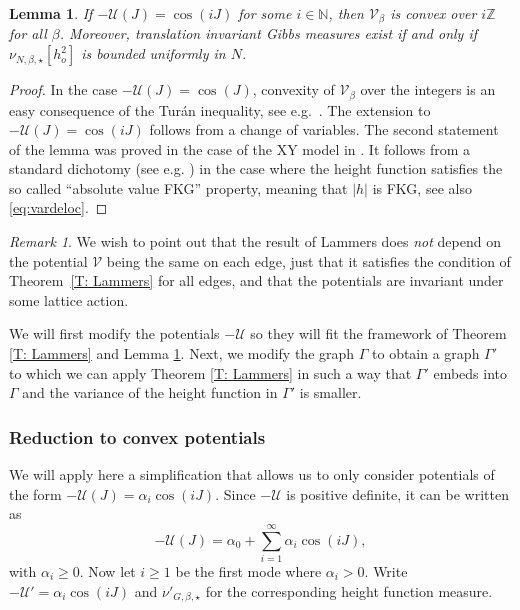 \documentclass[11pt, reqno]{amsart}
\newtheorem{lemma}[theorem]{Lemma}
\numberwithin{equation}{section}
\theoremstyle{definition}
\theoremstyle{remark}
\newtheorem{remark}{Remark}
\newcommand{\ZZ}{\mathbb{Z}}
\newcommand{\NN}{\mathbb{N}}
\renewcommand{\c}[1]{\ensuremath{\mathcal{#1}}}
\newcommand{\J}{J}
\newcommand{\exact}{\star}
\begin{document}
\begin{lemma} \label{L: XY convex deloc}
	If $-\c{U}(\J) = \cos(i\J)$ for some $i \in \NN$, then $\c{V}_{\beta}$ is convex over $i\ZZ$ for all $\beta$. 
	Moreover, translation invariant Gibbs measures exist if and only if $\nu_{N, \beta, \exact}[h_o^2]$ is bounded uniformly in $N$. 
\end{lemma}
\begin{proof}
	In the case $-\c{U}(\J) = \cos(\J)$, convexity of $\c{V}_{\beta}$ over the integers is an easy consequence of the Tur\'an inequality, see e.g.~\cite{vEnLis}. 
	The extension to $-\c{U}(\J) = \cos(i\J)$ follows from a change of variables. 
	The second statement of the lemma was proved in the case of the XY model in \cite[Theorem 4]{vEnLis}. 
	It follows from a standard dichotomy (see e.g. \cite{LamOtt}) in the case where the height function satisfies the so called ``absolute value FKG'' property, 
	meaning that $|h|$ is FKG, see also \eqref{eq:vardeloc}. 
\end{proof}

\begin{remark}
	We wish to point out that the result of Lammers does \emph{not} depend on the potential $\c{V}$ being the same on each edge, just that it satisfies the condition of Theorem~\ref{T: Lammers} for all edges, and that the potentials are invariant under some lattice action. 
\end{remark}

We will first modify the potentials $-\c{U}$ so they will fit the framework of Theorem \ref{T: Lammers} and Lemma \ref{L: XY convex deloc}. 
Next, we modify the graph $\Gamma$ to obtain a graph $\Gamma'$ to which we can apply Theorem \ref{T: Lammers}
in such a way that $\Gamma'$ embeds into $\Gamma$ and the variance of the height function in $\Gamma'$ is smaller. 

\subsubsection{Reduction to convex potentials} \label{sec: red to convex}
We will apply here a simplification that allows us to only consider potentials of the form $-\c{U}(\J) = \alpha_i \cos(i\J)$. 
Since $-\c{U}$ is positive definite, it can be written as
\[
	-\c{U}(\J) = \alpha_0 + \sum_{i = 1}^\infty \alpha_i\cos(i \J),
\]
with $\alpha_i \geq 0$. Now let $i \geq 1$ be the first mode where $\alpha_i > 0$. Write $-\c{U}'= \alpha_i \cos(i\J)$ 
and $\nu'_{G, \beta, \exact}$ for the corresponding height function measure. 
\end{document}
